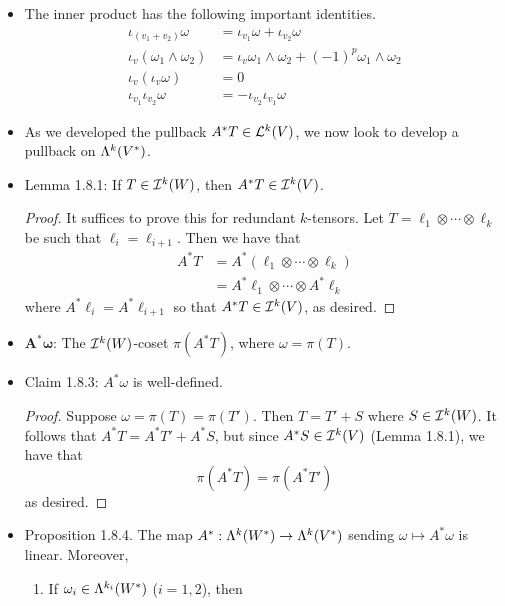 \documentclass[../notes.tex]{subfiles}
\begin{document}
\begin{itemize}
    \item The inner product has the following important identities.
    \begin{align*}
        \iota_{(v_1+v_2)}\omega &= \iota_{v_1}\omega+\iota_{v_2}\omega\\
        \iota_v(\omega_1\wedge\omega_2) &= \iota_v\omega_1\wedge\omega_2+(-1)^p\omega_1\wedge\omega_2\\
        \iota_v(\iota_v\omega) &= 0\\
        \iota_{v_1}\iota_{v_2}\omega &= -\iota_{v_2}\iota_{v_1}\omega
    \end{align*}
    \item {}As we developed the pullback $A^*T\in\lin[k]{V}$, we now look to develop a pullback on $\lam[k]{V^*}$.
    \item Lemma 1.8.1: If $T\in\ide[k]{W}$, then $A^*T\in\ide[k]{V}$.
    \begin{proof}
        It suffices to prove this for redundant $k$-tensors. Let $T=\ell_1\otimes\cdots\otimes\ell_k$ be such that $\ell_i=\ell_{i+1}$. Then we have that
        \begin{align*}
            A^*T &= A^*(\ell_1\otimes\cdots\otimes\ell_k)\\
            &= A^*\ell_1\otimes\cdots\otimes A^*\ell_k\tag*{Exercise 1.3.iii}
        \end{align*}
        where $A^*\ell_i=A^*\ell_{i+1}$ so that $A^*T\in\ide[k]{V}$, as desired.
    \end{proof}
    \item $\bm{A^*\omega}$: The $\ide[k]{W}$-coset $\pi(A^*T)$, where $\omega=\pi(T)$.
    \item Claim 1.8.3: $A^*\omega$ is well-defined.
    \begin{proof}
        Suppose $\omega=\pi(T)=\pi(T')$. Then $T=T'+S$ where $S\in\ide[k]{W}$. It follows that $A^*T=A^*T'+A^*S$, but since $A^*S\in\ide[k]{V}$ (Lemma 1.8.1), we have that
        \begin{equation*}
            \pi(A^*T) = \pi(A^*T')
        \end{equation*}
        as desired.
    \end{proof}
    \item Proposition 1.8.4. The map $A^*:\lam[k]{W^*}\to\lam[k]{V^*}$ sending $\omega\mapsto A^*\omega$ is linear. Moreover,
    \begin{enumerate}
        \item If $\omega_i\in\lam[k_i]{W^*}$ ($i=1,2$), then
        \begin{equation*}

\end{equation*}
\end{enumerate}
\end{itemize}
\end{document}
